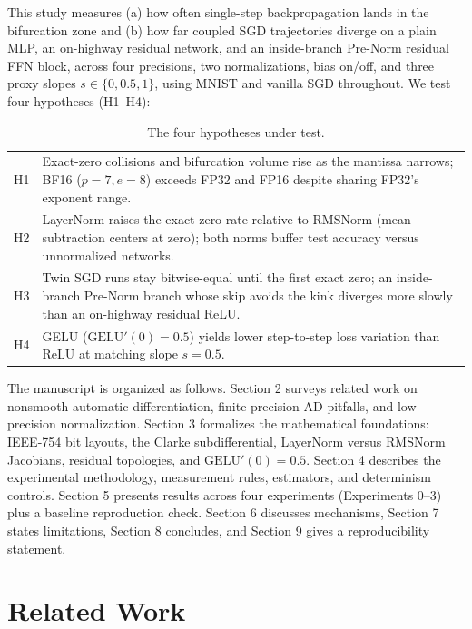 \documentclass[11pt]{article}
\begin{document}
This study measures (a) how often single-step backpropagation lands in the bifurcation zone and (b) how far coupled SGD trajectories diverge on a plain MLP, an on-highway residual network, and an inside-branch Pre-Norm residual FFN block, across four precisions, two normalizations, bias on/off, and three proxy slopes $s\in\{0,0.5,1\}$, using MNIST and vanilla SGD throughout. We test four hypotheses (H1--H4):

\begin{table}[htbp]
\centering
\begin{tabular}{l p{}}
\toprule
H1 & Exact-zero collisions and bifurcation volume rise as the mantissa narrows; BF16 ($p=7,e=8$) exceeds FP32 and FP16 despite sharing FP32's exponent range.\\
H2 & LayerNorm raises the exact-zero rate relative to RMSNorm (mean subtraction centers at zero); both norms buffer test accuracy versus unnormalized networks.\\
H3 & Twin SGD runs stay bitwise-equal until the first exact zero; an inside-branch Pre-Norm branch whose skip avoids the kink diverges more slowly than an on-highway residual ReLU.\\
H4 & GELU ($\mathrm{GELU}'(0)=0.5$) yields lower step-to-step loss variation than ReLU at matching slope $s=0.5$.\\
\bottomrule
\end{tabular}
\caption{The four hypotheses under test.}
\label{tab:hypotheses}
\end{table}

The manuscript is organized as follows. Section 2 surveys related work on nonsmooth automatic differentiation, finite-precision AD pitfalls, and low-precision normalization. Section 3 formalizes the mathematical foundations: IEEE-754 bit layouts, the Clarke subdifferential, LayerNorm versus RMSNorm Jacobians, residual topologies, and $\mathrm{GELU}'(0)=0.5$. Section 4 describes the experimental methodology, measurement rules, estimators, and determinism controls. Section 5 presents results across four experiments (Experiments 0--3) plus a baseline reproduction check. Section 6 discusses mechanisms, Section 7 states limitations, Section 8 concludes, and Section 9 gives a reproducibility statement.

\section{Related Work}\label{sec:related-work}
\end{document}
